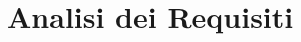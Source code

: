 \documentclass{tstextbook}
\begin{document}
\chapter{Analisi dei Requisiti}

\begin{summary}
  \blindtext
\end{summary}



\printbibliography{}


\printindex
\end{document}
